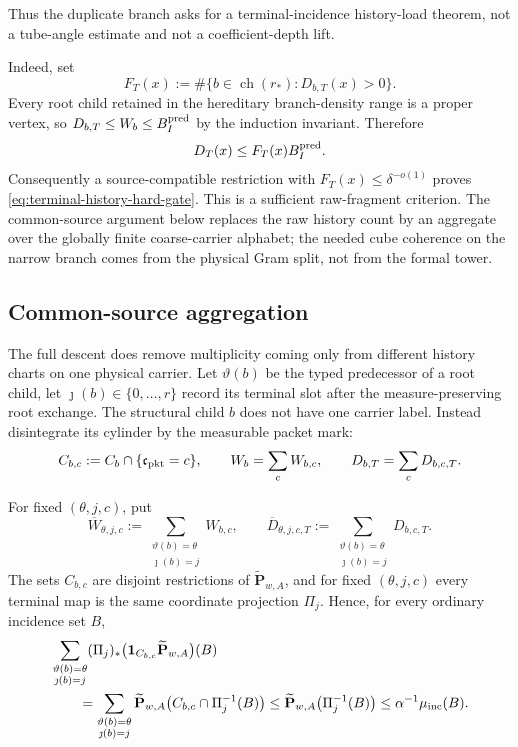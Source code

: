\documentclass[11pt]{article}
\begin{document}
Thus the duplicate branch asks for a terminal-incidence history-load theorem,
not a tube-angle estimate and not a coefficient-depth lift.

Indeed, set
\[
 F_T(x):=\#\{b\in\operatorname{ch}(r_\ast):D_{b,T}(x)>0\}.
\]
Every root child retained in the hereditary branch-density range is a proper vertex, so
\(D_{b,T}\le W_b\le B_I^{\rm pred}\) by the induction invariant.  Therefore
\begin{equation}\label{eq:history-fragment-count-suffices}
 D_T(x)\le F_T(x)B_I^{\rm pred}.
\end{equation}
Consequently a source-compatible restriction with
\(F_T(x)\le\delta^{-o(1)}\) proves
\eqref{eq:terminal-history-hard-gate}.  This is a sufficient raw-fragment
criterion.  The common-source argument below replaces the raw history count by
an aggregate over the globally finite coarse-carrier alphabet; the needed cube
coherence on the narrow branch comes from the physical Gram split, not from
the formal tower.

\subsection{Common-source aggregation}

The full descent does remove multiplicity coming only from different history
charts on one physical carrier.  Let \(\vartheta(b)\) be the typed predecessor
of a root child, let \(\jmath(b)\in\{0,\ldots,r\}\) record its terminal slot
after the measure-preserving root exchange.  The structural child \(b\) does
not have one carrier label.  Instead disintegrate its cylinder by the measurable
packet mark:
\[
 C_{b,c}:=C_b\cap\{\mathfrak c_{\rm pkt}=c\},
 \qquad
 W_b=\sum_cW_{b,c},
 \qquad
 D_{b,T}=\sum_cD_{b,c,T}.
\]

For fixed \((\theta,j,c)\), put
\[
 \overline W_{\theta,j,c}
 :=\sum_{\substack{\vartheta(b)=\theta\\ \jmath(b)=j}}W_{b,c},
 \qquad
 \overline D_{\theta,j,c,T}
 :=\sum_{\substack{\vartheta(b)=\theta\\ \jmath(b)=j}}D_{b,c,T}.
\]
The sets \(C_{b,c}\) are disjoint restrictions of
\(\widetilde{\mathbf P}_{w,A}\), and for fixed \((\theta,j,c)\) every terminal
map is the same coordinate projection \(\Pi_j\).  Hence, for every ordinary
incidence set \(B\),
\begin{align}
 &\sum_{\substack{\vartheta(b)=\theta\\\jmath(b)=j}}
   (\Pi_j)_*\bigl({\bf1}_{C_{b,c}}\widetilde{\mathbf P}_{w,A}\bigr)(B)
   \nonumber\\
 &\qquad=
 \sum_{\substack{\vartheta(b)=\theta\\\jmath(b)=j}}
 \widetilde{\mathbf P}_{w,A}
 \bigl(C_{b,c}\cap\Pi_j^{-1}(B)\bigr)
 \le
 \widetilde{\mathbf P}_{w,A}\bigl(\Pi_j^{-1}(B)\bigr)
 \le\alpha^{-1}\mu_{\rm inc}(B).
 \label{eq:typed-aggregate-rn-proof}
\end{align}
\end{document}
